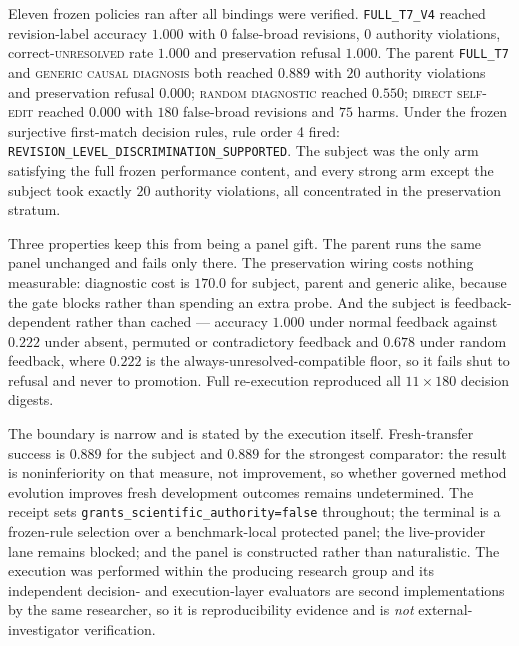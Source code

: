 Eleven frozen policies ran after all bindings were verified. \texttt{FULL\_T7\_V4}
reached revision-label accuracy $1.000$ with $0$ false-broad revisions, $0$
authority violations, correct-\textsc{unresolved} rate $1.000$ and preservation
refusal $1.000$. The parent \texttt{FULL\_T7} and \textsc{generic causal
diagnosis} both reached $0.889$ with $20$ authority violations and preservation
refusal $0.000$; \textsc{random diagnostic} reached $0.550$; \textsc{direct
self-edit} reached $0.000$ with $180$ false-broad revisions and $75$ harms. Under
the frozen surjective first-match decision rules, rule order 4 fired:
\texttt{REVISION\_LEVEL\_DISCRIMINATION\_SUPPORTED}. The subject was the only arm
satisfying the full frozen performance content, and every strong arm except the
subject took exactly $20$ authority violations, all concentrated in the
preservation stratum.

Three properties keep this from being a panel gift. The parent runs the same
panel unchanged and fails only there. The preservation wiring costs nothing
measurable: diagnostic cost is $170.0$ for subject, parent and generic alike,
because the gate blocks rather than spending an extra probe. And the subject is
feedback-dependent rather than cached --- accuracy $1.000$ under normal feedback
against $0.222$ under absent, permuted or contradictory feedback and $0.678$
under random feedback, where $0.222$ is the always-unresolved-compatible floor,
so it fails shut to refusal and never to promotion. Full re-execution reproduced
all $11 \times 180$ decision digests.

The boundary is narrow and is stated by the execution itself. Fresh-transfer
success is $0.889$ for the subject and $0.889$ for the strongest comparator: the
result is noninferiority on that measure, not improvement, so whether governed
method evolution improves fresh development outcomes remains undetermined. The
receipt sets \texttt{grants\_scientific\_authority=false} throughout; the terminal
is a frozen-rule selection over a benchmark-local protected panel; the
live-provider lane remains blocked; and the panel is constructed rather than
naturalistic. The execution was performed within the producing research group and
its independent decision- and execution-layer evaluators are second
implementations by the same researcher, so it is reproducibility evidence and is
\emph{not} external-investigator verification.

